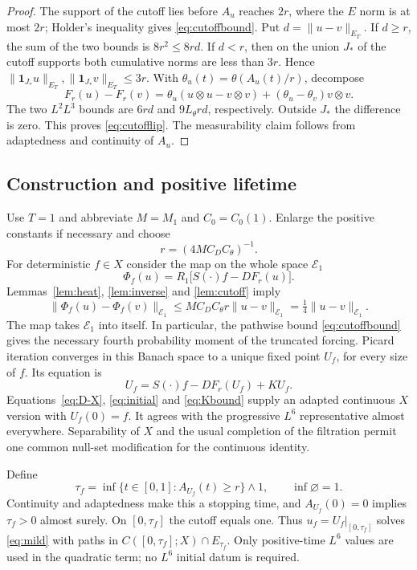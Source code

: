 \documentclass[11pt]{article}
\numberwithin{equation}{section}
\begin{document}
\begin{proof}
The support of the cutoff lies before $A_u$ reaches $2r$, where the
$E$ norm is at most $2r$; Holder's inequality gives
\eqref{eq:cutoffbound}. Put $d=\|u-v\|_{E_T}$.
If $d\geq r$, the sum of the two bounds is $8r^2\leq8rd$.
If $d<r$, then on the union $J_*$ of the cutoff supports both cumulative
norms are less than $3r$. Hence
$\|\mathbf1_{J_*}u\|_{E_T},\|\mathbf1_{J_*}v\|_{E_T}\leq3r$.
With $\theta_u(t)=\theta(A_u(t)/r)$, decompose
\[
 F_r(u)-F_r(v)
 =\theta_u(u\otimes u-v\otimes v)
   +(\theta_u-\theta_v)v\otimes v.
\]
The two $L^2L^3$ bounds are $6rd$ and $9L_\theta rd$, respectively.
Outside $J_*$ the difference is zero. This proves \eqref{eq:cutofflip}.
The measurability claim follows from adaptedness and continuity of $A_u$.
\end{proof}

\subsection{Construction and positive lifetime}
Use $T=1$ and abbreviate $M=M_1$ and $C_0=C_0(1)$. Enlarge the positive
constants if necessary and choose
\begin{equation}\label{eq:radius}
 r=(4MC_DC_\theta)^{-1}.
\end{equation}
For deterministic $f\in X$ consider the map on the whole space
$\mathcal E_1$
\[
 \Phi_f(u)=R_1\big[S(\cdot)f-DF_r(u)\big].
\]
Lemmas~\ref{lem:heat}, \ref{lem:inverse} and \ref{lem:cutoff} imply
\[
 \|\Phi_f(u)-\Phi_f(v)\|_{\mathcal E_1}
 \leq MC_DC_\theta r\|u-v\|_{\mathcal E_1}
 =\tfrac14\|u-v\|_{\mathcal E_1}.
\]
The map takes $\mathcal E_1$ into itself. In particular, the pathwise bound
\eqref{eq:cutoffbound} gives the necessary fourth probability moment of
the truncated forcing. Picard iteration converges in this Banach space to
a unique fixed point $U_f$, for every size of $f$. Its equation is
\begin{equation}\label{eq:truncated}
 U_f=S(\cdot)f-DF_r(U_f)+KU_f.
\end{equation}
Equations~\eqref{eq:D-X}, \eqref{eq:initial} and \eqref{eq:Kbound} supply
an adapted continuous $X$ version with $U_f(0)=f$. It agrees with the
progressive $L^6$ representative almost everywhere. Separability of $X$
and the usual completion of the filtration permit one common null-set
modification for the continuous identity.

Define
\begin{equation}\label{eq:lifetime}
 \tau_f=\inf\{t\in[0,1]:A_{U_f}(t)\geq r\}\wedge1,
 \qquad \inf\varnothing=1.
\end{equation}
Continuity and adaptedness make this a stopping time, and
$A_{U_f}(0)=0$ implies $\tau_f>0$ almost surely.
On $[0,\tau_f]$ the cutoff equals one. Thus
$u_f=U_f|_{[0,\tau_f]}$ solves \eqref{eq:mild} with paths in
$C([0,\tau_f];X)\cap E_{\tau_f}$. Only positive-time $L^6$ values are
used in the quadratic term; no $L^6$ initial datum is required.
\end{document}

